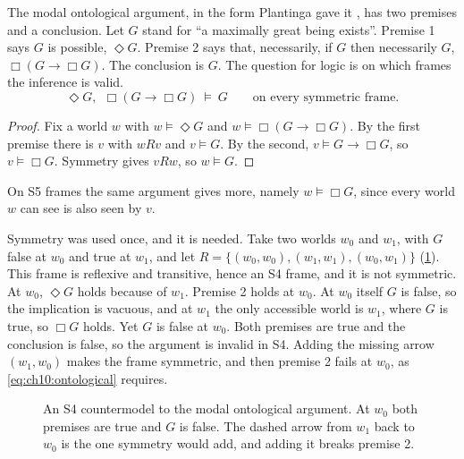 The modal ontological argument, in the form Plantinga gave it \citep{plantinga1974}, has two premises and a conclusion. Let $G$ stand for ``a maximally great being exists''. Premise 1 says $G$ is possible, $\Diamond G$. Premise 2 says that, necessarily, if $G$ then necessarily $G$, $\Box(G\to\Box G)$. The conclusion is $G$. The question for logic is on which frames the inference is valid.
\begin{equation}
\Diamond G,\ \ \Box(G\to\Box G)\ \models\ G\qquad\text{on every symmetric frame}.
\label{eq:ch10:ontological}
\end{equation}
\begin{proof}
Fix a world $w$ with $w\models\Diamond G$ and $w\models\Box(G\to\Box G)$. By the first premise there is $v$ with $wRv$ and $v\models G$. By the second, $v\models G\to\Box G$, so $v\models\Box G$. Symmetry gives $vRw$, so $w\models G$.
\end{proof}
On S5 frames the same argument gives more, namely $w\models\Box G$, since every world $w$ can see is also seen by $v$.

Symmetry was used once, and it is needed. Take two worlds $w_0$ and $w_1$, with $G$ false at $w_0$ and true at $w_1$, and let $R=\{(w_0,w_0),(w_1,w_1),(w_0,w_1)\}$ (\cref{fig:ch10:s4}). This frame is reflexive and transitive, hence an S4 frame, and it is not symmetric. At $w_0$, $\Diamond G$ holds because of $w_1$. Premise 2 holds at $w_0$. At $w_0$ itself $G$ is false, so the implication is vacuous, and at $w_1$ the only accessible world is $w_1$, where $G$ is true, so $\Box G$ holds. Yet $G$ is false at $w_0$. Both premises are true and the conclusion is false, so the argument is invalid in S4. Adding the missing arrow $(w_1,w_0)$ makes the frame symmetric, and then premise 2 fails at $w_0$, as \eqref{eq:ch10:ontological} requires.

\begin{figure}[tbp]
\centering
{}
\caption{An S4 countermodel to the modal ontological argument. At $w_0$ both premises are true and $G$ is false. The dashed arrow from $w_1$ back to $w_0$ is the one symmetry would add, and adding it breaks premise 2.}
\label{fig:ch10:s4}
\end{figure}

